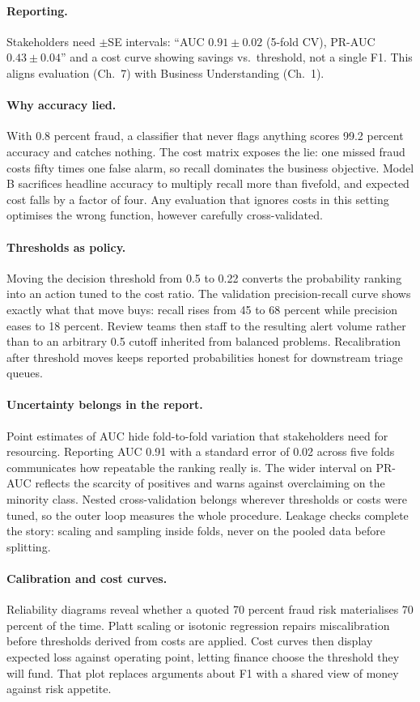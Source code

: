 \paragraph{Reporting.} Stakeholders need $\pm$SE intervals: ``AUC $0.91\pm0.02$ (5-fold CV), PR-AUC $0.43\pm0.04$'' and a cost curve showing savings vs.\ threshold, not a single F1. This aligns evaluation (Ch.~7) with Business Understanding (Ch.~1).
\paragraph{Why accuracy lied.} With 0.8 percent fraud, a classifier that never flags anything scores 99.2 percent accuracy and catches nothing.
The cost matrix exposes the lie: one missed fraud costs fifty times one false alarm, so recall dominates the business objective.
Model B sacrifices headline accuracy to multiply recall more than fivefold, and expected cost falls by a factor of four.
Any evaluation that ignores costs in this setting optimises the wrong function, however carefully cross-validated.
\paragraph{Thresholds as policy.} Moving the decision threshold from 0.5 to 0.22 converts the probability ranking into an action tuned to the cost ratio.
The validation precision-recall curve shows exactly what that move buys: recall rises from 45 to 68 percent while precision eases to 18 percent.
Review teams then staff to the resulting alert volume rather than to an arbitrary 0.5 cutoff inherited from balanced problems.
Recalibration after threshold moves keeps reported probabilities honest for downstream triage queues.
\paragraph{Uncertainty belongs in the report.} Point estimates of AUC hide fold-to-fold variation that stakeholders need for resourcing.
Reporting AUC 0.91 with a standard error of 0.02 across five folds communicates how repeatable the ranking really is.
The wider interval on PR-AUC reflects the scarcity of positives and warns against overclaiming on the minority class.
Nested cross-validation belongs wherever thresholds or costs were tuned, so the outer loop measures the whole procedure.
Leakage checks complete the story: scaling and sampling inside folds, never on the pooled data before splitting.
\paragraph{Calibration and cost curves.} Reliability diagrams reveal whether a quoted 70 percent fraud risk materialises 70 percent of the time.
Platt scaling or isotonic regression repairs miscalibration before thresholds derived from costs are applied.
Cost curves then display expected loss against operating point, letting finance choose the threshold they will fund.
That plot replaces arguments about F1 with a shared view of money against risk appetite.
